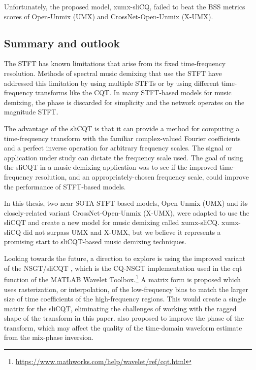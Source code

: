 \documentclass[report.tex]{subfiles}
\begin{document}
Unfortunately, the proposed model, xumx-sliCQ, failed to beat the BSS metrics scores of Open-Unmix (UMX) and CrossNet-Open-Unmix (X-UMX).

\subsection{Summary and outlook}

The STFT has known limitations that arise from its fixed time-frequency resolution. Methods of spectral music demixing that use the STFT have addressed this limitation by using multiple STFTs or by using different time-frequency transforms like the CQT. In many STFT-based models for music demixing, the phase is discarded for simplicity and the network operates on the magnitude STFT.

The advantage of the sliCQT is that it can provide a method for computing a time-frequency transform with the familiar complex-valued Fourier coefficients and a perfect inverse operation for arbitrary frequency scales. The signal or application under study can dictate the frequency scale used. The goal of using the sliCQT in a music demixing application was to see if the improved time-frequency resolution, and an appropriately-chosen frequency scale, could improve the performance of STFT-based models.

In this thesis, two near-SOTA STFT-based models, Open-Unmix (UMX) and its closely-related variant CrossNet-Open-Unmix (X-UMX), were adapted to use the sliCQT and create a new model for music demixing called xumx-sliCQ. xumx-sliCQ did not surpass UMX and X-UMX, but we believe it represents a promising start to sliCQT-based music demixing techniques.

Looking towards the future, a direction to explore is using the improved variant of the NSGT/sliCQT \parencite{variableq1}, which is the CQ-NSGT implementation used in the cqt function of the MATLAB Wavelet Toolbox.\footnote{\url{https://www.mathworks.com/help/wavelet/ref/cqt.html}} A matrix form is proposed which uses rasterization, or interpolation, of the low-frequency bins to match the larger size of time coefficients of the high-frequency regions. This would create a single matrix for the sliCQT, eliminating the challenges of working with the ragged shape of the transform in this paper. \textcite{variableq1} also proposed to improve the phase of the transform, which may affect the quality of the time-domain waveform estimate from the mix-phase inversion.
\end{document}

